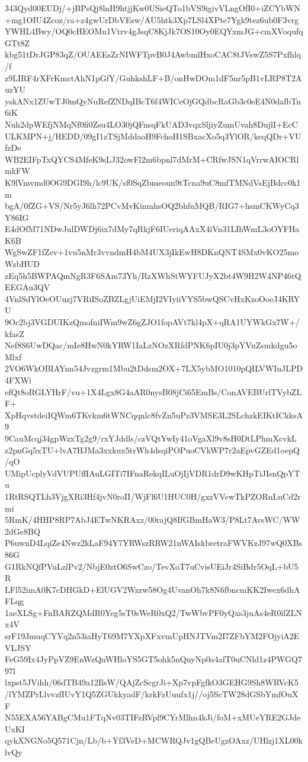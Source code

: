 343Qyd00EUDj/+jBPsQj8lnH9htjjKw0USieQTo1bVS9igivVLngOfI0+iZCYbWN
+mg1OIU4Zcoz/ra+z4gwUrDbVEsw/AU5htk3Xp7LSl4XPte7Ygk9tez6ub0F3vrg
YWHL4Bwy/OQ0cHEOMu1Vtrv4gJsqC8KjJk7OS10Oy0EQYxmJG+cmXVoqufqGTt8Z
kbg51tDrJGP83qZ/OUAEEsZrNIWFTpvB0J4AwbmlHxoCAC8tJVswZ5S7Pxfhlq/f
z9LIRF4rXFrKmctAhN1pGfY/GuhkshLF+B/onHwDOm1dF5nr5pB1vLRP8T2AuzYU
yskANx1ZUwTJ0mQyNuRefZNDqIBcT6f4WICeOjGQdbcRaGb3c0eE4N0dafbTn6iK
Nuh2dpWEfjNMqNf0fi0Zsu4LO30jQFnsqFkUAD3vqxSljiyZumUvah8DujlI+EcC
ULKMPN+j/HEDD/09gI1zTSjMddaoH9FchoH1SBxacXo5q3YlOR/keqQDr+VUfzDe
WB2EIFpTxQYCS4MfeK9sLJ32owFl2m6bpnl7dMrM+CRfwJSN1qVrrwAIOCRlmkFW
K9lVmvmd0OG9DGI9h/lc9UK/sf0SqZbmeoun9tTcna9uC8mfTMNdVsEjBdcc0k1m
bgA/0fZG+VS/Nr5yJ6lh72PCvMvKinmhsOQ2bhfuMQB/RIG7+hsmCKWyCq3Y86IG
E4dOfM71NDwJulDWDj6ix7dMy7qRkjF6IUeriqAAxX4iVn31LIhWmL3oOYFHaK6B
WgSwZF1fZev+1vu5nMr3vvndmH4bM4UX3jIkEwH8DKnQNT4SMx0vKO25moWzbHUD
zEq5h5BWPAQmNgR3F6SAm73Yh/RzXWhStWYFUJyX2bt4W9H2W4NP46tQEEGAu3QV
4VnlSdYlOeOUuzj7VRiISoZBZLgjUiEMjI2VIyiiVYS5bwQSCvHxKzoOoeJ4KRYU
9Oc2bj3VGDUIKzQmofniIWm9wZ6gZJO1fopAVt7kl4pX+qRA1UYWkGx7W+/kfasZ
Nef8S6UwDQac/mIe8HwN0kYRW1IaLzNOzXRfdPNK6pIU0j3pYVnZsmkdgu5oMlxf
2VO6WkOBIAYnn54Jvzgrm1Mbu2tDdsm2OX+7LX5ybMO1010pQILVWIuJLPD4FXWi
efQt8oRGLYHrF/vu+1X4Lgx8G4aAR0nysB08jCi65EmBs/ConAVEBUrlTVybZLF+
XpHqvstdeiIQWm6TKvkm6tWNCqqnlc8fvZn5uPz3VMSE3L2SLchzkEIKtICkksA9
9CauMcqj34gpWzxTg2g9/rxYJddls/czVQtYwIy41oVgaXl9v8sH0DtLPhmXcvkL
z2pnGq5xTU+lvA7HJMa3xxkux5trWh4dsqiPOPuoCVkWP7r2aEpvGZEd1oepQ/qO
UMipUcplyVdVUPUffIAuLGITi7IFnaRekqILuOjIjVDR1drD9wKHpTiJIsnQpYTu
1RtRSQTLh3VjgXRi3Hf4jvN0roII/WjFl6U1HUC0H/gxzVVewTkPZORnLuCd2rmi
5RmK/4HHP8RP7AbJ4ETwNKRAxz/00rajQ8IfGBmHaW3/P8Lt7AvsWC/WW2dGe8BQ
P6uwnD4LqiZe4Nwz2kLaF94Y7YRWszRRW21nWAIskbretraFWVKzJ97wQ0XBs86G
G1RkNQfPVuLzlPv2/NbjE0ztO6SwCzo/TevXoT7uCvisUEiJr4SiBdr5OqL+bU5R
LFl52imA0K7cDHGkD+ElUGV2Wzzw58Og4UvanOh7k8N6fbncmKK2Iwex6dhAFLqg
1aeXLSg+FnBARZQMdR0Yeg5sT0sWeR0xQ2/TwWbvPF0yQxs3juAs4eR0ilZLNx4V
srF19JmuqCYVq2n53iaHyT69M7YXpXFxvmUpHNJTVm2I7ZFbYM2FOjyiA2EVLJSY
FeG59Ix4JyPpVZ9EnWzQnWHloYS5GT5ohk5nQnyNp0a4afT0uCNld1z4PWGQ797l
lxpst5JVihh/06dTB49a12IlsW/QAjZcScgrJi+Xp7vpFgfkO3GEHG9Sh8WRVcK5
/lYMZPrLlvvzfIUvY1Q5ZGUkkyadF/krkFzUuufx1j//oj5ScTW28dGSbYmfOuXF
N55EXA56YABgCMu1FTqNv03TIFzRVpl9CYrMlhn4kJi/foM+xMUeYRE2GJdeUxKI
qykXNGNo5Q571Cjn/Lb/b+Yf3VeD+MCWRQJv1gQBeUgzOAxz/UHlzj1XL00klvQy
